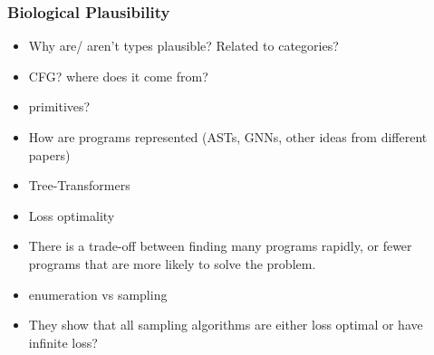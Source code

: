 \subsubsection{Biological Plausibility}
\begin{itemize}
    \item Why are/ aren't types plausible? Related to categories?
    \item CFG? where does it come from?
    \item primitives?
\end{itemize}



\begin{itemize}
    \item How are programs represented (ASTs, GNNs, other ideas from different papers)
    \item Tree-Transformers
\end{itemize}











\begin{itemize}
    \item Loss optimality
    \item There is a trade-off between finding many programs rapidly, or fewer programs that are more likely to solve the problem.
    \item enumeration vs sampling
    \item They show that all sampling algorithms are either loss optimal or have infinite loss?
\end{itemize}















